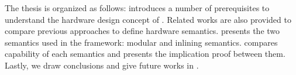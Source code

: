 The thesis is organized as follows: 
introduces a number of prerequisites to understand the hardware design
concept of \Bluespec{}. Related works are also provided to compare
previous approaches to define hardware semantics.
 presents the two semantics used in the
\Kami{} framework: modular and inlining
semantics.  compares capability of each
semantics and presents the implication proof between them. Lastly, we
draw conclusions and give future works in .

